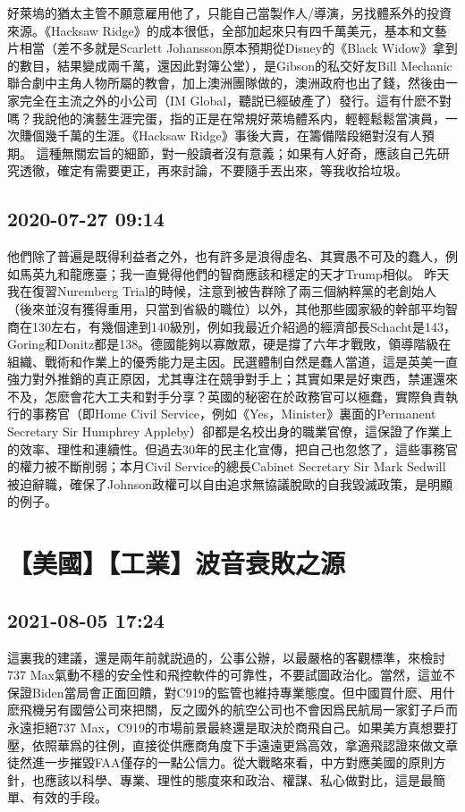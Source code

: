 \documentclass[twocolumn]{ctexart}
\begin{document}
好萊塢的猶太主管不願意雇用他了，只能自己當製作人/導演，另找體系外的投資來源。《Hacksaw Ridge》的成本很低，全部加起來只有四千萬美元，基本和文藝片相當（差不多就是Scarlett Johansson原本預期從Disney的《Black Widow》拿到的數目，結果變成兩千萬，還因此對簿公堂），是Gibson的私交好友Bill Mechanic聯合劇中主角人物所屬的教會，加上澳洲團隊做的，澳洲政府也出了錢，然後由一家完全在主流之外的小公司（IM Global，聽説已經破產了）發行。這有什麽不對嗎？我說他的演藝生涯完蛋，指的正是在常規好萊塢體系内，輕輕鬆鬆當演員，一次賺個幾千萬的生涯。《Hacksaw Ridge》事後大賣，在籌備階段絕對沒有人預期。
這種無關宏旨的細節，對一般讀者沒有意義；如果有人好奇，應該自己先研究透徹，確定有需要更正，再來討論，不要隨手丟出來，等我收拾垃圾。
\subsection*{2020-07-27 09:14}

他們除了普遍是既得利益者之外，也有許多是浪得虛名、其實愚不可及的蠢人，例如馬英九和龍應臺；我一直覺得他們的智商應該和穩定的天才Trump相似。
昨天我在復習Nuremberg Trial的時候，注意到被告群除了兩三個納粹黨的老創始人（後來並沒有獲得重用，只當到省級的職位）以外，其他那些國家級的幹部平均智商在130左右，有幾個達到140級別，例如我最近介紹過的經濟部長Schacht是143，Goring和Donitz都是138。德國能夠以寡敵眾，硬是撐了六年才戰敗，領導階級在組織、戰術和作業上的優秀能力是主因。民選體制自然是蠢人當道，這是英美一直強力對外推銷的真正原因，尤其專注在競爭對手上；其實如果是好東西，禁運還來不及，怎麽會花大工夫和對手分享？英國的秘密在於政務官可以極蠢，實際負責執行的事務官（即Home Civil Service，例如《Yes，Minister》裏面的Permanent Secretary Sir Humphrey Appleby）卻都是名校出身的職業官僚，這保證了作業上的效率、理性和連續性。但過去30年的民主化宣傳，把自己也忽悠了，這些事務官的權力被不斷削弱；本月Civil Service的總長Cabinet Secretary Sir Mark Sedwill被迫辭職，確保了Johnson政權可以自由追求無協議脫歐的自我毀滅政策，是明顯的例子。
\section*{【美國】【工業】波音衰敗之源}
\subsection*{2021-08-05 17:24}

這裏我的建議，還是兩年前就説過的，公事公辦，以最嚴格的客觀標準，來檢討737 Max氣動不穩的安全性和飛控軟件的可靠性，不要試圖政治化。當然，這並不保證Biden當局會正面回饋，對C919的監管也維持專業態度。但中國買什麽、用什麽飛機另有國營公司來把關，反之國外的航空公司也不會因爲民航局一家釘子戶而永遠拒絕737 Max，C919的市場前景最終還是取決於商飛自己。如果美方真想要打壓，依照華爲的往例，直接從供應商角度下手遠遠更爲高效，拿適飛認證來做文章徒然進一步摧毀FAA僅存的一點公信力。從大戰略來看，中方對應美國的原則方針，也應該以科學、專業、理性的態度來和政治、權謀、私心做對比，這是最簡單、有效的手段。
\end{document}
